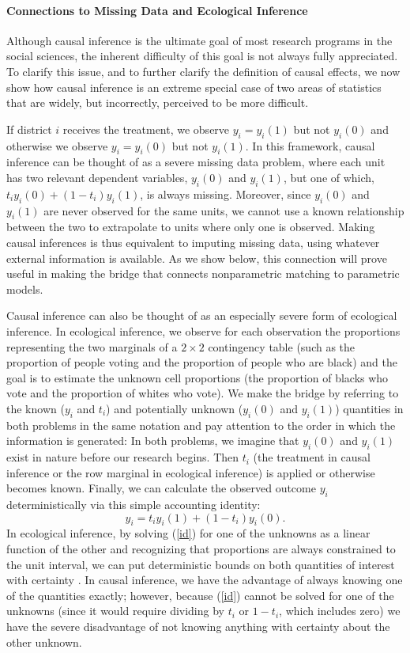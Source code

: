 \documentclass[11pt,titlepage]{article}
\begin{document}
\paragraph{Connections to Missing Data and Ecological Inference}
Although causal inference is the ultimate goal of most research
programs in the social sciences, the inherent difficulty of this goal
is not always fully appreciated.  To clarify this issue, and to
further clarify the definition of causal effects, we now show how
causal inference is an extreme special case of two areas of statistics
that are widely, but incorrectly, perceived to be more difficult.

If district $i$ receives the treatment, we observe $y_i=y_i(1)$ but
not $y_i(0)$ and otherwise we observe $y_i=y_i(0)$ but not $y_i(1)$.
In this framework, causal inference can be thought of as a severe
missing data problem, where each unit has two relevant dependent
variables, $y_i(0)$ and $y_i(1)$, but one of which, $t_iy_i(0) +
(1-t_i)y_i(1)$, is always missing.  Moreover, since $y_i(0)$ and
$y_i(1)$ are never observed for the same units, we cannot use a known
relationship between the two to extrapolate to units where only one is
observed.  Making causal inferences is thus equivalent to imputing
missing data, using whatever external information is available.  As we
show below, this connection will prove useful in making the bridge
that connects nonparametric matching to parametric models.

Causal inference can also be thought of as an especially severe form
of ecological inference.  In ecological inference, we observe for each
observation the proportions representing the two marginals of a
$2\times 2$ contingency table (such as the proportion of people voting
and the proportion of people who are black) and the goal is to
estimate the unknown cell proportions (the proportion of blacks who
vote and the proportion of whites who vote).  We make the bridge by
referring to the known ($y_i$ and $t_i$) and potentially unknown
($y_i(0)$ and $y_i(1)$) quantities in both problems in the same
notation and pay attention to the order in which the information is
generated: In both problems, we imagine that $y_i(0)$ and $y_i(1)$
exist in nature before our research begins.  Then $t_i$ (the treatment
in causal inference or the row marginal in ecological inference) is
applied or otherwise becomes known.  Finally, we can calculate the
observed outcome $y_i$ deterministically via this simple accounting
identity:
\begin{equation}
  \label{id}
  y_i = t_iy_i(1) + (1-t_i)y_i(0).
\end{equation}
In ecological inference, by solving (\ref{id}) for one of the unknowns
as a linear function of the other and recognizing that proportions are
always constrained to the unit interval, we can put deterministic
bounds on both quantities of interest with certainty
\citep[][ch.5]{King97}.  In causal inference, we have the advantage of
always knowing one of the quantities exactly; however, because
(\ref{id}) cannot be solved for one of the unknowns (since it would
require dividing by $t_i$ or $1-t_i$, which includes zero) we have the
severe disadvantage of not knowing anything with certainty about the
other unknown.
\end{document}
